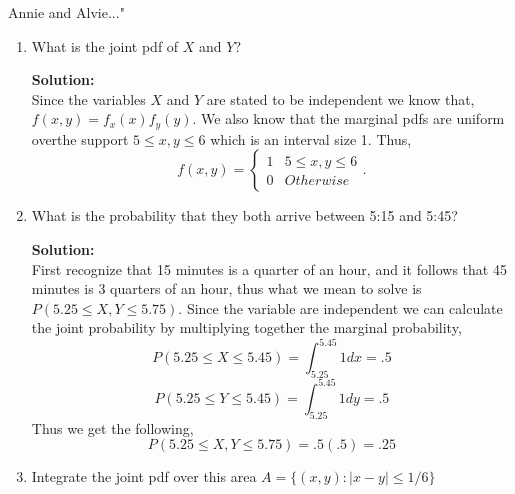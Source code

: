 \documentclass[12pt]{article}
\makeatletter
\theoremstyle{homework}
\newenvironment{exercise}[1]
{\def\@currentlabel{#1}\exercisecore}
{\endexercisecore}
\newcommand{\localhead}[1]{\par\smallskip\noindent\textbf{#1}\nobreak\\}%
\newcommand\solution{\localhead{Solution:}}
\makeatother
\begin{document}
\begin{exercise}{5.10}  "Annie and Alvie..." \\
  \begin{enumerate}
    \item What is the joint pdf of $X$ and $Y$?\\
    \solution Since the variables $X$ and $Y$ are stated to be independent we know that, $f(x,y) = f_x(x)f_y(y)$. We also know that the 
    marginal pdfs are uniform overthe support $5 \le x,y \le 6$ which is an interval size 1. Thus,
    \begin{equation*}
      f(x,y) = 
      \begin{cases} 
        1 &  5 \le x,y \le 6\\
        0 & Otherwise 
     \end{cases}.
    \end{equation*}
    \vspace{.25in}


    \item What is the probability that they both arrive between 5:15 and 5:45?\\
    \solution First recognize that 15 minutes is a quarter of an hour, and it follows that 45 minutes is 3 quarters of an hour, 
    thus what we mean to solve is $P(5.25 \le X,Y \le 5.75)$. Since the variable are independent we can calculate the joint probability by multiplying together the marginal probability,
    \begin{equation*}
      P(5.25 \le X \le 5.45) = \int_{5.25}^{5.45} 1 dx  = .5
    \end{equation*}
    \begin{equation*}
      P(5.25 \le Y \le 5.45) = \int_{5.25}^{5.45} 1 dy  = .5
    \end{equation*}
    Thus we get the following,
    \begin{equation*}
      P(5.25 \le X,Y \le 5.75) = .5(.5) = .25
    \end{equation*}
    \vspace{.25in}






    \item Integrate the joint pdf over this area $A = \{(x,y):|x - y|\le 1/6\}$\\
    

\end{enumerate}
\end{exercise}
\end{document}
